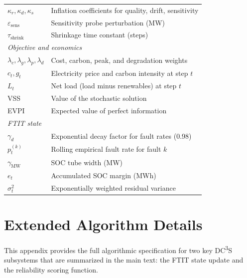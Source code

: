 \documentclass[11pt,a4paper]{article}
\begin{document}
\begin{table}[htbp]
\begin{tabular}{p{2.5cm}p{10.0cm}}
\quad $\kappa_r, \kappa_d, \kappa_s$ & Inflation coefficients for quality, drift, sensitivity \\
\quad $\varepsilon_{\text{sens}}$ & Sensitivity probe perturbation (MW) \\
\quad $\tau_{\text{shrink}}$ & Shrinkage time constant (steps) \\
\midrule
\multicolumn{2}{l}{\textit{Objective and economics}} \\
\quad $\lambda_c, \lambda_g, \lambda_p, \lambda_d$ & Cost, carbon, peak, and degradation weights \\
\quad $c_t, g_t$ & Electricity price and carbon intensity at step $t$ \\
\quad $L_t$ & Net load (load minus renewables) at step $t$ \\
\quad VSS & Value of the stochastic solution \\
\quad EVPI & Expected value of perfect information \\
\midrule
\multicolumn{2}{l}{\textit{FTIT state}} \\
\quad $\gamma_d$ & Exponential decay factor for fault rates (0.98) \\
\quad $p_t^{(k)}$ & Rolling empirical fault rate for fault $k$ \\
\quad $\gamma_{\text{MW}}$ & SOC tube width (MW) \\
\quad $e_t$ & Accumulated SOC margin (MWh) \\
\quad $\sigma^2_t$ & Exponentially weighted residual variance \\
\bottomrule
\end{tabular}
\end{table}

\section{Extended Algorithm Details}\label{app:algorithms}

This appendix provides the full algorithmic specification for two key DC\textsuperscript{3}S subsystems that are summarized in the main text: the FTIT state update and the reliability scoring function.
\end{document}
